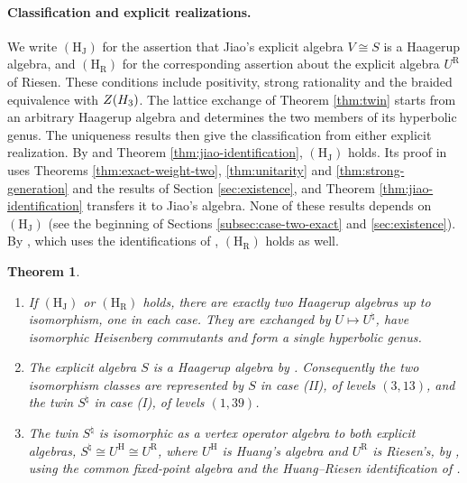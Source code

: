 \documentclass[leqno]{article}
\let\cal\relax
\newcommand{\cal}{\mathcal}
\newtheorem{thm}{Theorem}[section]
\numberwithin{equation}{section}
\begin{document}
\paragraph{Classification and explicit realizations.}
\label{par:external-hypotheses}
We write $\mathrm{(H_J)}$ for the assertion that Jiao's explicit algebra $V\cong S$ is a Haagerup algebra, and $\mathrm{(H_R)}$ for the corresponding assertion about the explicit algebra $U^{\mathrm R}$ of Riesen. These conditions include positivity, strong rationality and the braided equivalence with $Z(\cal H_3)$. The lattice exchange of Theorem \ref{thm:twin} starts from an arbitrary Haagerup algebra and determines the two members of its hyperbolic genus. The uniqueness results then give the classification from either explicit realization. By \cite[Theorem 6.1]{ArhIII} and Theorem \ref{thm:jiao-identification}, $\mathrm{(H_J)}$ holds. Its proof in \cite{ArhIII} uses Theorems \ref{thm:exact-weight-two}, \ref{thm:unitarity} and \ref{thm:strong-generation} and the results of Section \ref{sec:existence}, and Theorem \ref{thm:jiao-identification} transfers it to Jiao's algebra. None of these results depends on $\mathrm{(H_J)}$ (see the beginning of Sections \ref{subsec:case-two-exact} and \ref{sec:existence}). By \cite[Theorem 7.13]{ArhIII}, which uses the identifications of \cite[Proposition 4.1 and Theorem 7.3]{DJX26}, $\mathrm{(H_R)}$ holds as well.

\begin{thm}
\label{thm:intro-classification}
\begin{enumerate}
\item If $\mathrm{(H_J)}$ or $\mathrm{(H_R)}$ holds, there are exactly two Haagerup algebras up to isomorphism, one in each case. They are exchanged by $U\mapsto U^\natural$, have isomorphic Heisenberg commutants and form a single hyperbolic genus.
\item The explicit algebra $S$ is a Haagerup algebra by \cite[Theorem 6.1]{ArhIII}. Consequently the two isomorphism classes are represented by $S$ in case (II), of levels $(3,13)$, and the twin $S^\natural$ in case (I), of levels $(1,39)$.
\item The twin $S^\natural$ is isomorphic as a vertex operator algebra to both explicit algebras, $S^\natural\cong U^{\mathrm H}\cong U^{\mathrm R}$, where $U^{\mathrm H}$ is Huang's algebra and $U^{\mathrm R}$ is Riesen's, by \cite[Theorem 7.9 and Corollary 7.10]{ArhIII}, using the common fixed-point algebra and the Huang--Riesen identification of \cite[Theorem 7.3 and Proposition 4.1]{DJX26}.
\end{enumerate}
\end{thm}
\end{document}
